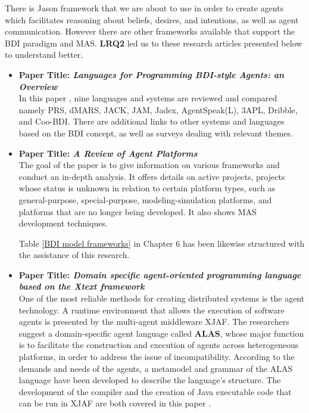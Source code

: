\vspace{.5cm}

There is Jason framework that we are about to use in order to create agents which facilitates reasoning about beliefs, desires, and intentions, as well as agent communication. However there are other frameworks available that support the \ac{BDI} paradigm and \ac{MAS}. \textbf{LRQ2} led us to these research articles presented below to understand better.

\begin{itemize}[label={}]

\item \textbf{Paper Title: \textit{Languages for Programming \ac{BDI}-style Agents: an Overview}}\\

In this paper \cite{9lang}, nine languages and systems are reviewed and compared namely PRS, dMARS, JACK, JAM, Jadex, AgentSpeak(L), 3APL, Dribble, and Coo-\ac{BDI}. There are additional links to other systems and languages based on the \ac{BDI} concept, as well as surveys dealing with relevant themes.

\newpage

\item \textbf{Paper Title: \textit{A Review of Agent Platforms}}\\

The goal of the paper \cite{review} is to give information on various frameworks and conduct an in-depth analysis. It offers details on active projects, projects whose status is unknown in relation to certain platform types, such as general-purpose, special-purpose, modeling-simulation platforms, and platforms that are no longer being developed. It also shows \ac{MAS} development techniques.

\vspace{.5cm}

Table \ref{BDI model frameworks} in Chapter 6 has been likewise structured with the assistance of this research.

\vspace{.5cm}

\item \textbf{Paper Title: \textit{Domain specific agent-oriented programming language based on the Xtext framework}} \\

One of the most reliable methods for creating distributed systems is the agent technology. A runtime environment that allows the execution of software agents is presented by the multi-agent middleware XJAF. The researchers suggest a domain-specific agent language called \textbf{ALAS}, whose major function is to facilitate the construction and execution of agents across heterogeneous platforms, in order to address the issue of incompatibility. According to the demands and needs of the agents, a metamodel and grammar of the ALAS language have been developed to describe the language's structure. The development of the compiler and the creation of Java executable code that can be run in XJAF are both covered in this paper \cite{xtext}.


\end{itemize}
